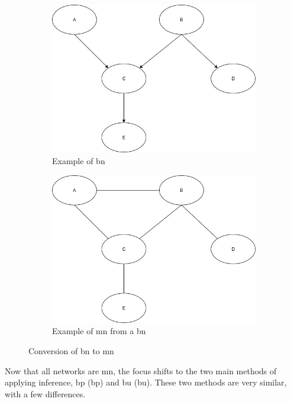 \documentclass[12pt,a4paper]{article}
\begin{document}
\begin{figure}[htbp]
	\centering
	\begin{subfigure}[b]{0.45\textwidth}
		\centering
		\includegraphics[width=\textwidth]{B_Network_Example.jpg}
		\caption{Example of \acl{bn}}
		\label{fig:bn}
	\end{subfigure}
	\hfill
	\begin{subfigure}[b]{0.45\textwidth}
		\centering
		\includegraphics[width=\textwidth]{BN-MN.jpg}
		\caption{Example of \acl{mn} from a \acs{bn}}
		\label{fig:bn-mn}
	\end{subfigure}
	\caption{Conversion of \acl{bn} to \acl{mn}}
	\label{fig:moral}
\end{figure}

Now that all networks are \acs{mn}, the focus shifts to the two main methods of applying inference, \acl{bp} (\acs{bp}) and \acl{bu} (\acs{bu}). These two methods are very similar, with a few differences. 
\end{document}

